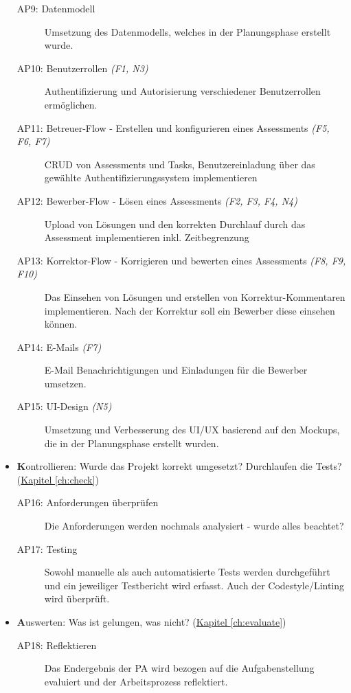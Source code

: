 \begin{itemize}
          \begin{description}
              \item[AP9: Datenmodell] Umsetzung des Datenmodells, welches in der Planungsphase erstellt wurde.
              \item[AP10: Benutzerrollen {\normalfont\emph{(F1, N3)}}] Authentifizierung und Autorisierung verschiedener Benutzerrollen ermöglichen.
              \item[AP11: Betreuer-Flow - Erstellen und konfigurieren eines Assessments {\normalfont\emph{(F5, F6, F7)}}] CRUD von Assessments und Tasks, Benutzereinladung über das gewählte Authentifizierungssystem implementieren
              \item[AP12: Bewerber-Flow - Lösen eines Assessments {\normalfont\emph{(F2, F3, F4, N4)}}] Upload von Lösungen und den korrekten Durchlauf durch das Assessment implementieren inkl. Zeitbegrenzung
              \item[AP13: Korrektor-Flow - Korrigieren und bewerten eines Assessments {\normalfont\emph{(F8, F9, F10)}}] Das Einsehen von Lösungen und erstellen von Korrektur-Kommentaren implementieren. Nach der Korrektur soll ein Bewerber diese einsehen können.
              \item[AP14: E-Mails {\normalfont\emph{(F7)}}] E-Mail Benachrichtigungen und Einladungen für die Bewerber umsetzen.
              \item[AP15: UI-Design {\normalfont\emph{(N5)}}] Umsetzung und Verbesserung des UI/UX basierend auf den Mockups, die in der Planungsphase erstellt wurden.
          \end{description}
    \item \textbf{K}ontrollieren: Wurde das Projekt korrekt umgesetzt? Durchlaufen die Tests? (\hyperref[ch:check]{Kapitel \ref*{ch:check}})
          \begin{description}
              \item[AP16: Anforderungen überprüfen] Die Anforderungen werden nochmals analysiert - wurde alles beachtet?
              \item[AP17: Testing] Sowohl manuelle als auch automatisierte Tests werden durchgeführt und ein jeweiliger Testbericht wird erfasst. Auch der Codestyle/Linting wird überprüft.
          \end{description}
    \item \textbf{A}uswerten: Was ist gelungen, was nicht? (\hyperref[ch:evaluate]{Kapitel \ref*{ch:evaluate}})
          \begin{description}
              \item[AP18: Reflektieren] Das Endergebnis der PA wird bezogen auf die Aufgabenstellung evaluiert und der Arbeitsprozess reflektiert.
          \end{description}
\end{itemize}

